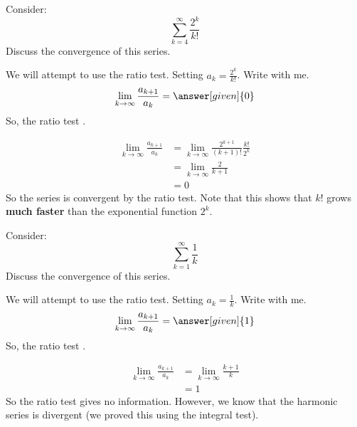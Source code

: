 \documentclass{ximera}
\begin{document}
\begin{example}
  Consider:
  \[
  \sum_{k=4}^\infty \frac{2^k}{k!}
  \]
  Discuss the convergence of this series.
  \begin{explanation}
    We will attempt to use the ratio test. Setting $a_k = \frac{2^k}{k!}$. Write with me.
    \[
    \lim_{k \to \infty} \frac{a_{k+1}}{a_k} = \answer[given]{0}
    \]
    So, the ratio test
	 .	
	 \begin{hint}
	   \begin{align*}
	     \lim_{k \to \infty} \frac{a_{k+1}}{a_k} &= \lim_{k \to \infty} \frac{2^{k+1}}{(k+1)!} \frac{k!}{2^k}\\
	     &=\lim_{k \to \infty} \frac{2}{k+1}\\
	     &=0
	   \end{align*}
	   So the series is convergent by the ratio test.  Note that
           this shows that $k!$ grows \textbf{much faster} than the
           exponential function $2^k$.
	 \end{hint}
  \end{explanation}
\end{example}



\begin{example}
  Consider: 
  \[
  \sum_{k=1}^\infty \frac{1}{k}
  \]
  Discuss the convergence of this series.
  \begin{explanation}
    We will attempt to use the ratio test. Setting $a_k =
    \frac{1}{k}$. Write with me.
    \[
    \lim_{k \to \infty} \frac{a_{k+1}}{a_k} = \answer[given]{1}
    \]
    So, the ratio test
	 .
	 \begin{hint}
           \begin{align*}
	     \lim_{k \to \infty} \frac{a_{k+1}}{a_k} &= \lim_{k \to \infty} \frac{k+1}{k}\\
	     &=1
	   \end{align*}
	   So the ratio test gives no information.
	   However, we know that the harmonic series is divergent (we proved this using the integral test).
	 \end{hint}
  \end{explanation}
\end{example}
\end{document}
